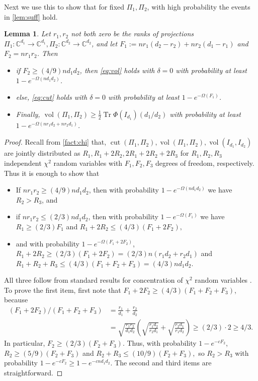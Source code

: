 \documentclass{article}
\newtheorem{lemma}[theorem]{Lemma}
\newcommand{\C}{{\mathbb{C}}}
\newcommand{\cut}{\operatorname{cut}}
\newcommand{\vol}{\operatorname{vol}}
\newcommand\tr{\operatorname{Tr}}
\begin{document}
Next we use this to show that for fixed $\Pi_1, \Pi_2$, with high probability the events in \cref{lem:suff} hold.
\begin{lemma}\label{lem:probabilities}
Let $r_1, r_2$ not both zero be the ranks of projections $\Pi_1: \C^{d_1} \to \C^{d_1}, \Pi_2: \C^{d_2} \to \C^{d_2}$, and let $F_1:= n r_1(d_2 - r_2) + n r_2(d_1-r_1)$ and $F_2 = n r_1 r_2$. Then
\begin{itemize}
\item if $F_2 \geq (4/9) n d_1 d_2$, then \cref{eq:vol} holds with $\delta = 0$ with probability at least $1 - e^{-\Omega( n d_1 d_2)}$.
\item else, \cref{eq:cut} holds with $\delta = 0$ with probability at least $1 - e^{-\Omega( F_1)}$.
\item Finally, $\vol(\Pi_1, \Pi_2) \geq \frac{1}{2}\tr \Phi(I_{d_1}) (d_1/d_2)$ with probability at least $1 - e^{- \Omega(n r_1 d_2 + n r_2 d_1)}$.
\end{itemize}
\end{lemma}


\begin{proof}
Recall from \cref{fact:chi} that, $\cut(\Pi_1, \Pi_2), \vol(\Pi_1, \Pi_2), \vol(I_{d_1}, I_{d_2})$ are jointly distributed as $R_1, R_1 + 2R_2, 2R_1 + 2R_2 + 2R_3$ for $R_1, R_2, R_3$ independent $\chi^2$ random variables with $F_1, F_2, F_3$ degrees of freedom, respectively. Thus it is enough to show that
\begin{itemize}
\item If $nr_1 r_2 \geq (4/9) n d_1 d_2$, then with probability $1 - e^{- \Omega( n d_1 d_2)}$ we have $R_2 > R_3$, and
\item if $nr_1 r_2 \leq (2/3) n d_1 d_2$, then with probability $1 - e^{- \Omega(F_1)}$ we have $R_1 \geq (2/3) F_1$ and $R_1 + 2R_2 \leq (4/3) (F_1 + 2 F_2),$
\item and with probability $1 - e^{- \Omega(F_1 + 2 F_2)}$, $R_1 + 2R_2 \geq (2/3) (F_1 + 2 F_2) = (2/3) n (r_1 d_2 + r_2 d_1)$ and $R_1 + R_2 + R_3 \leq (4/3)(F_1 + F_2 + F_3) = (4/3)n d_1 d_2$.
\end{itemize}
All three follow from standard results for concentration of $\chi^2$ random variables \cite{W19}. To prove the first item, first note that $F_1 + 2 F_2 \geq (4/3)(F_1 + F_2 + F_3)$, because
\begin{align*}
(F_1 + 2 F_2)/( F_1 + F_2 + F_3) &= \frac{r_1}{d_1} + \frac{r_2}{d_2}\\
 &= \sqrt{ \frac{r_1 r_2}{d_1 d_2}}\left( \sqrt{ \frac{r_1 d_2}{r_2 d_1}} + \sqrt{ \frac{r_2 d_1}{r_1 d_2}}\right) \geq (2/3) \cdot 2 \geq 4/3.
\end{align*}
In particular, $F_2 \geq (2/3)(F_2 + F_3)$. Thus, with probability $1 - e^{- c F_2}$, $R_2 \geq (5/9) (F_2 + F_3)$ and $R_2 + R_3 \leq (10/9) (F _2 + F_3),$ so $R_2 > R_3$ with probability $1 - e^{- c F_2} \geq 1 - e^{- c n d_1 d_2}$. The second and third items are straightforward.
\end{proof}
\end{document}
